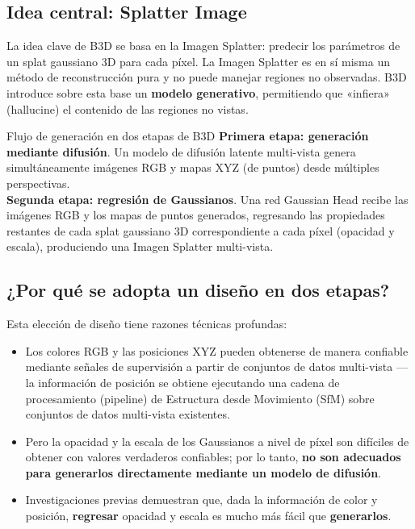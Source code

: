 \documentclass[a4paper]{article}
\begin{document}
\subsection{Idea central: Splatter Image}

La idea clave de B3D se basa en la Imagen Splatter: predecir los parámetros de un splat gaussiano 3D para cada píxel. La Imagen Splatter es en sí misma un método de reconstrucción pura y no puede manejar regiones no observadas. B3D introduce sobre esta base un \textbf{modelo generativo}, permitiendo que «infiera» (hallucine) el contenido de las regiones no vistas.

\begin{importantbox}{Flujo de generación en dos etapas de B3D}
\textbf{Primera etapa: generación mediante difusión}. Un modelo de difusión latente multi-vista genera simultáneamente imágenes RGB y mapas XYZ (de puntos) desde múltiples perspectivas.\\
\textbf{Segunda etapa: regresión de Gaussianos}. Una red Gaussian Head recibe las imágenes RGB y los mapas de puntos generados, regresando las propiedades restantes de cada splat gaussiano 3D correspondiente a cada píxel (opacidad y escala), produciendo una Imagen Splatter multi-vista.
\end{importantbox}

\subsection{¿Por qué se adopta un diseño en dos etapas?}

Esta elección de diseño tiene razones técnicas profundas:

\begin{itemize}
    \item Los colores RGB y las posiciones XYZ pueden obtenerse de manera confiable mediante señales de supervisión a partir de conjuntos de datos multi-vista —la información de posición se obtiene ejecutando una cadena de procesamiento (pipeline) de Estructura desde Movimiento (SfM) sobre conjuntos de datos multi-vista existentes.
    \item Pero la opacidad y la escala de los Gaussianos a nivel de píxel son difíciles de obtener con valores verdaderos confiables; por lo tanto, \textbf{no son adecuados para generarlos directamente mediante un modelo de difusión}.
    \item Investigaciones previas demuestran que, dada la información de color y posición, \textbf{regresar} opacidad y escala es mucho más fácil que \textbf{generarlos}.
\end{itemize}
\end{document}
